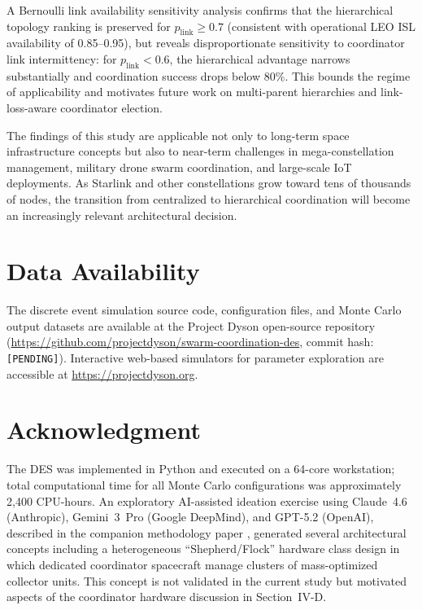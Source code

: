 \documentclass[journal]{IEEEtran}
\begin{document}
A Bernoulli link availability sensitivity analysis confirms that the hierarchical topology ranking is preserved for $p_{\text{link}} \geq 0.7$ (consistent with operational LEO ISL availability of 0.85--0.95), but reveals disproportionate sensitivity to coordinator link intermittency: for $p_{\text{link}} < 0.6$, the hierarchical advantage narrows substantially and coordination success drops below 80\%. This bounds the regime of applicability and motivates future work on multi-parent hierarchies and link-loss-aware coordinator election.

The findings of this study are applicable not only to long-term space infrastructure concepts but also to near-term challenges in mega-constellation management, military drone swarm coordination, and large-scale IoT deployments. As Starlink and other constellations grow toward tens of thousands of nodes, the transition from centralized to hierarchical coordination will become an increasingly relevant architectural decision.

\section*{Data Availability}

The discrete event simulation source code, configuration files, and Monte Carlo output datasets are available at the Project Dyson open-source repository (\url{https://github.com/projectdyson/swarm-coordination-des}, commit hash: \texttt{[PENDING]}). Interactive web-based simulators for parameter exploration are accessible at \url{https://projectdyson.org}.

\section*{Acknowledgment}

The DES was implemented in Python and executed on a 64-core workstation; total computational time for all Monte Carlo configurations was approximately 2{,}400 CPU-hours. An exploratory AI-assisted ideation exercise using Claude~4.6 (Anthropic), Gemini~3~Pro (Google DeepMind), and GPT-5.2 (OpenAI), described in the companion methodology paper \cite{dyson_multimodel}, generated several architectural concepts including a heterogeneous ``Shepherd/Flock'' hardware class design in which dedicated coordinator spacecraft manage clusters of mass-optimized collector units. This concept is not validated in the current study but motivated aspects of the coordinator hardware discussion in Section~IV-D.
\end{document}
